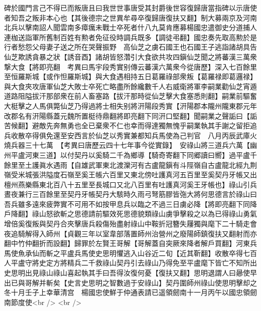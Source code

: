 碑於國門言己不得已而叛唐且曰我世世事唐受其封爵後世容復歸唐當指碑以示唐使者知吾之叛非本心也【其後德宗之世異牟尋卒復歸唐復扶又翻】制大募兩京及河南北兵以擊南詔人聞雲南多瘴癘未戰士卒死者什八九莫肯應募楊國忠遣御史分道捕人連枷送詣軍所舊制百姓有勲者免征役時調兵既多【調徒弔翻】國忠奏先取高勲於是行者愁怨父母妻子送之所在哭聲振野　高仙芝之虜石國王也石國王子逃詣諸胡具告仙芝欺誘貪暴之狀【誘音酉】諸胡皆怒濳引大食欲共攻四鎭仙芝聞之將蕃漢三萬衆撃大食【將即亮翻　考異曰馬宇段秀實别傳云蕃漢六萬衆今從唐歷】深入七百餘里至恒羅斯城【或作怛羅斯城】與大食遇相持五日葛羅祿部衆叛【葛羅禄即葛邏禄】與大食夾攻唐軍仙芝大敗士卒死亡略盡所餘纔數千人右威衛將軍李嗣業勸仙芝宵遁道路阻隘拔汗那部衆在前人畜塞路【拔汗那時從仙芝擊大食塞悉則翻】嗣業前驅奮大梃擊之人馬俱斃仙芝乃得過將士相失别將汧陽段秀實【汧陽郡本隴州隴東郡元年改郡名有汧陽縣蓋元魏所置梃待鼎翻將即亮翻下同汧口堅翻】聞嗣業之聲詬曰【詬苦候翻】避敵先奔無勇也全已棄衆不仁也幸而得達獨無愧乎嗣業執其手謝之留拒追兵收散卒得俱免還至安西言於仙芝以秀實兼都知兵馬使為己判官　八月丙辰武庫火燒兵器三十七萬　【考異曰唐歷云四十七年事今從實錄】　安祿山將三道兵六萬【幽州平盧河東三道】以付契丹以奚騎二千為鄉導【騎奇寄翻下同郷讀曰嚮】過平盧千餘里至土護眞水遇雨【自雄武軍東北渡灤河有古盧龍鎭有斗陘嶺自古盧龍北經九荆嶺受米城張洪隘度石嶺至奚王帳六百里又東北傍吐護真河五百里至奚契丹牙帳又出檀州燕樂縣東北百八十五里至長城口又北八百里有吐護真河奚王牙帳也】祿山引兵晝夜兼行三百餘里至契丹牙帳契丹大駭時久雨弓弩筋膠皆㢮大將何思德言於祿山曰吾兵雖多遠來疲弊實不可用不如按甲息兵以臨之不過三日虜必降【將即亮翻下同降戶降翻】祿山怒欲斬之思德請前驅效死思德貌類祿山虜爭擊殺之以為已得祿山勇氣增倍奚復叛與契丹合夾擊唐兵殺傷殆盡射祿山中鞍折冠簪失屨獨與麾下二十騎走會夜追騎解得入師州【貞觀三年以室韋部落置師州治營州之廢陽師鎮復扶又翻射而亦翻中竹仲翻折而設翻】歸罪於左賢王哥解【哥解蓋自突厥來降者解戶買翻】河東兵馬使魚承仙而斬之平盧兵馬使史思明懼逃入山谷近二旬【近其靳翻】收散卒得七百人平盧守將史定方將精兵二千救祿山契丹引去祿山乃得免至平盧麾下皆亡不知所出史思明出見祿山祿山喜起執其手曰吾得汝復何憂【復扶又翻】思明退謂人曰曏使早出已與哥解并斬矣【史言史思明之智數過于安祿山】契丹圍師州祿山使思明擊却之　冬十月壬子上幸華清宫　楊國忠使鮮于仲通表請已遥領劒南十一月丙午以國忠領劒南節度使<br />
<br />
